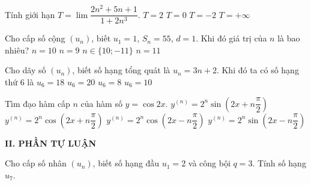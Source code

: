 \begin{ex}%
Tính giới hạn $T=\lim\dfrac{2n^2+5n+1}{1+2n^3}$.
\choice
{$T=2$}
{\True $T=0$}
{$T=-2$}
{$T=+\infty$}
\end{ex}

\begin{ex}%
Cho cấp số cộng $(u_n)$, biết $u_1=1$, $S_n=55$, $d=1$. Khi đó giá trị của $n$ là bao nhiêu?
\choice
{\True $n=10$}
{$n=9$}
{$n\in\{10;-11\}$}
{$n=11$}
\end{ex}

\begin{ex}%
Cho dãy số $(u_n)$, biết số hạng tổng quát là $u_n=3n+2$. Khi đó ta có số hạng thứ $6$ là
\choice
{$u_6=18$}
{\True $u_6=20$}
{$u_6=8$}
{$u_6=10$}
\end{ex} 

\begin{ex}%
Tìm đạo hàm cấp $n$ của hàm số $y=\cos2x$.
\choice
{$y^{(n)}=2^n\sin\left(2x+n\dfrac{\pi}{2}\right)$}
{\True $y^{(n)}=2^n\cos\left(2x+n\dfrac{\pi}{2}\right)$}
{$y^{(n)}=2^n\cos\left(2x-n\dfrac{\pi}{2}\right)$}
{$y^{(n)}=2^n\sin\left(2x-n\dfrac{\pi}{2}\right)$}
\end{ex}


\noindent\textbf{II. PHẦN TỰ LUẬN}
\begin{bt}%
Cho cấp số nhân $(u_n)$, biết số hạng đầu $u_1=2$ và công bội $q=3$. Tính số hạng $u_7$.
\end{bt}

